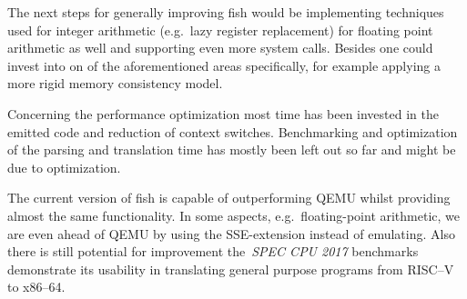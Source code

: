 The next steps for generally improving fish would be implementing techniques used for integer arithmetic (e.g.\ lazy register replacement) for floating point arithmetic as well and supporting even more system calls.
Besides one could invest into on of the aforementioned areas specifically, for example applying a more rigid memory consistency model.

Concerning the performance optimization most time has been invested in the emitted code and reduction of context switches.
Benchmarking and optimization of the parsing and translation time has mostly been left out so far and might be due to optimization.


The current version of fish is capable of outperforming QEMU whilst providing almost the same functionality.
In some aspects, e.g.\ floating-point arithmetic, we are even ahead of QEMU by using the SSE-extension instead of emulating.
Also there is still potential for improvement the~\textit{SPEC CPU 2017} benchmarks demonstrate its usability in translating general purpose programs from RISC--V to x86--64.